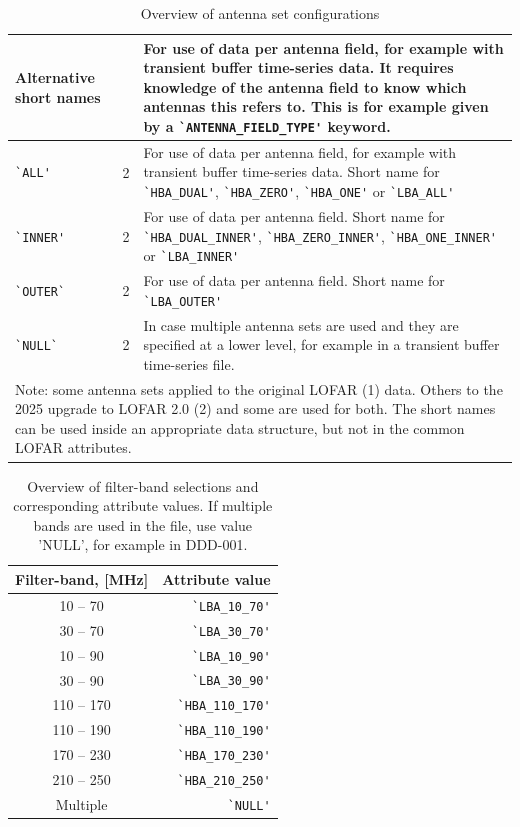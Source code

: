 \begin{table}[ht]
\begin{tabular}{|llp{9cm}|}
    \hline
    Alternative short names & \, & For use of data per antenna field, for example with transient buffer time-series data. It requires knowledge of the antenna field to know which antennas this refers to. This is for example given by a \verb|`ANTENNA_FIELD_TYPE'| keyword.  \\
    \hline
    \verb|`ALL'| & 2 & For use of data per antenna field, for example with transient buffer time-series data. Short name for \verb|`HBA_DUAL'|, \verb|`HBA_ZERO'|, \verb|`HBA_ONE'| or \verb|`LBA_ALL'| \\
    \verb|`INNER'| & 2 &  For use of data per antenna field. Short name for \verb|`HBA_DUAL_INNER'|, \verb|`HBA_ZERO_INNER'|, \verb|`HBA_ONE_INNER'| or \verb|`LBA_INNER'| \\
    \verb|`OUTER`| & 2 & For use of data per antenna field. Short name for \verb|`LBA_OUTER'| \\
    \verb|`NULL`| & 2 & In case multiple antenna sets are used and they are specified at a lower level, for example in a transient buffer time-series file. \\
    \hline
    \multicolumn{3}{p{16cm}}{Note: {\small some antenna sets applied to the original LOFAR (1) data. Others to the 2025 upgrade to LOFAR 2.0 (2) and some are used for both. The short names can be used inside an appropriate data structure, but not in the common LOFAR attributes.}} \\
  \end{tabular}
  \caption{Overview of antenna set configurations}
  \label{tab:antenna-set}
\end{table}

\begin{table}[ht]
  \centering
  \begin{tabular}{|cr|}
    \hline
    \sc Filter-band, [MHz] & \sc Attribute value \\
    \hline \hline
    10 -- 70   & \verb|`LBA_10_70'| \\
    30 -- 70   & \verb|`LBA_30_70'| \\
    10 -- 90   & \verb|`LBA_10_90'| \\
    30 -- 90   & \verb|`LBA_30_90'| \\
    110 -- 170 & \verb|`HBA_110_170'| \\
    110 -- 190 & \verb|`HBA_110_190'| \\
    170 -- 230 & \verb|`HBA_170_230'| \\
    210 -- 250 & \verb|`HBA_210_250'| \\
    Multiple  & \verb|`NULL'| \\
    \hline
  \end{tabular}
  \caption{Overview of filter-band selections and corresponding
    attribute values. If multiple bands are used in the file, use value 'NULL', for example in DDD-001.}
  \label{tab:filter-selection}
\end{table}


